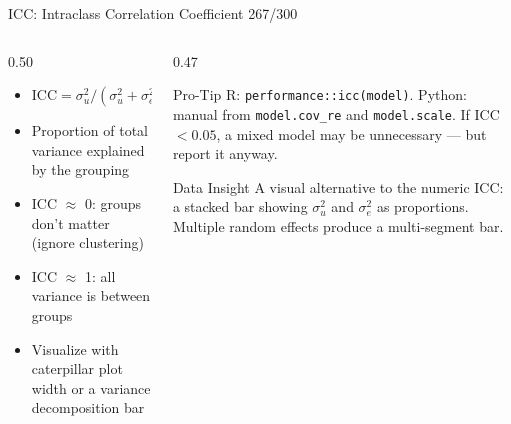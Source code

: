 \documentclass[10pt]{beamer}
\newcommand{\smark}[1]{\hfill{\scriptsize\color{codegray}#1}}
\begin{document}
\begin{frame}{ICC: Intraclass Correlation Coefficient}
\smark{267/300}
\begin{columns}[T]
\begin{column}{0.50\textwidth}
\begin{itemize}
    \item $\text{ICC} = \sigma^2_u / (\sigma^2_u + \sigma^2_e)$
    \item Proportion of total variance explained by the grouping
    \item ICC $\approx$ 0: groups don't matter (ignore clustering)
    \item ICC $\approx$ 1: all variance is between groups
    \item Visualize with caterpillar plot width or a variance decomposition bar
\end{itemize}
\end{column}
\begin{column}{0.47\textwidth}
\begin{alertblock}{Pro-Tip}
    \scriptsize R: \texttt{performance::icc(model)}. Python: manual from \texttt{model.cov\_re} and \texttt{model.scale}. If ICC $< 0.05$, a mixed model may be unnecessary --- but report it anyway.
\end{alertblock}
\vspace{0.1cm}
\begin{exampleblock}{Data Insight}
    \scriptsize A visual alternative to the numeric ICC: a stacked bar showing $\sigma^2_u$ and $\sigma^2_e$ as proportions. Multiple random effects produce a multi-segment bar.
\end{exampleblock}
\end{column}
\end{columns}
\end{frame}
\end{document}
